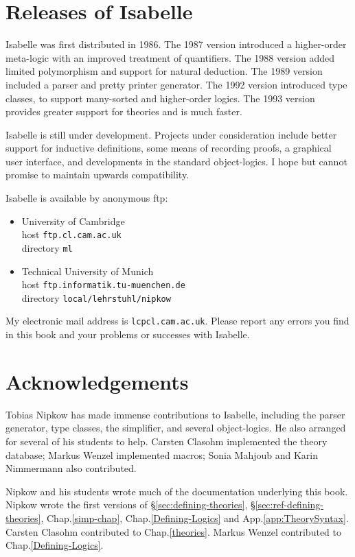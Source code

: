 \section*{Releases of Isabelle}
Isabelle was first distributed in 1986.  The 1987 version introduced a
higher-order meta-logic with an improved treatment of quantifiers.  The
1988 version added limited polymorphism and support for natural deduction.
The 1989 version included a parser and pretty printer generator.  The 1992
version introduced type classes, to support many-sorted and higher-order
logics.  The 1993 version provides greater support for theories and is
much faster.  

Isabelle is still under development.  Projects under consideration include
better support for inductive definitions, some means of recording proofs, a
graphical user interface, and developments in the standard object-logics.
I hope but cannot promise to maintain upwards compatibility.

Isabelle is available by anonymous ftp:
\begin{itemize}
\item University of Cambridge\\
        host {\tt ftp.cl.cam.ac.uk}\\
        directory {\tt ml}

\item Technical University of Munich\\
        host {\tt ftp.informatik.tu-muenchen.de}\\
        directory {\tt local/lehrstuhl/nipkow}
\end{itemize}
My electronic mail address is {\tt lcp\at cl.cam.ac.uk}.  Please report any
errors you find in this book and your problems or successes with Isabelle.


\section*{Acknowledgements} 
Tobias Nipkow has made immense contributions to Isabelle, including the
parser generator, type classes, the simplifier, and several object-logics.
He also arranged for several of his students to help.  Carsten Clasohm
implemented the theory database; Markus Wenzel implemented macros; Sonia
Mahjoub and Karin Nimmermann also contributed.  

Nipkow and his students wrote much of the documentation underlying this
book.  Nipkow wrote the first versions of \S\ref{sec:defining-theories},
\S\ref{sec:ref-defining-theories}, Chap.\ts\ref{simp-chap},
Chap.\ts\ref{Defining-Logics} and App.\ts\ref{app:TheorySyntax}\@.  Carsten
Clasohm contributed to Chap.\ts\ref{theories}.  Markus Wenzel contributed
to Chap.\ts\ref{Defining-Logics}.

